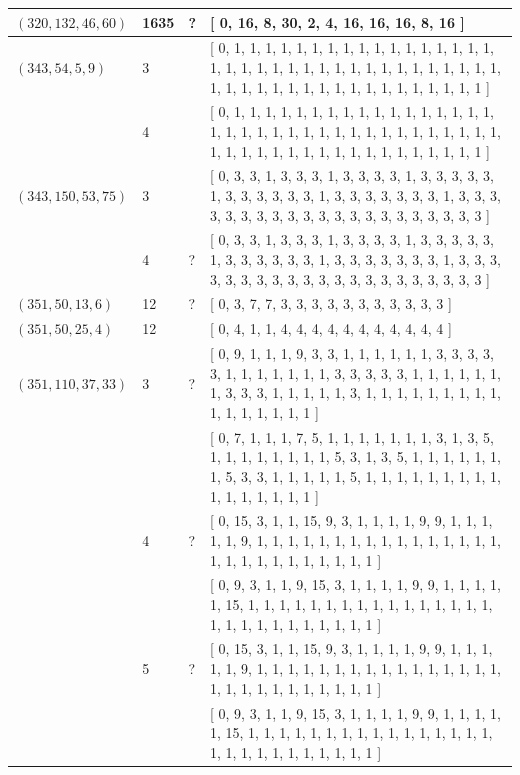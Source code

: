 \documentclass[12pt]{amsproc} %
\theoremstyle{definition}\newtheorem{defn}[thm]{Definition}
\theoremstyle{definition}\newtheorem{rem}[thm]{Remark}
\theoremstyle{definition}\newtheorem{ex}[thm]{Example}
\begin{document}
\begin{center}
\begin{longtable}{p{3.66cm}|P{0.8cm}|P{0.69cm}|p{10cm}}
		\hline
		 $(320, 132, 46, 60)$  & 1635 & ? & [ 0, 16, 8, 30, 2, 4, 16, 16, 16, 8, 16 ] \\
		\hline
		 $(343, 54, 5, 9)$  & 3 & \cite{Kantor_1986} & [ 0, 1, 1, 1, 1, 1, 1, 1, 1, 1, 1, 1, 1, 1, 1, 1, 1, 1, 1, 1, 1, 1, 1, 1, 1, 1, 1, 1, 1, 1, 1, 1, 1, 1, 1, 1, 1, 1, 1, 1, 1, 1, 1, 1, 1, 1, 1, 1, 1, 1, 1, 1, 1, 1, 1 ] \\
		   & 4 & \cite{Swartz_2015} & [ 0, 1, 1, 1, 1, 1, 1, 1, 1, 1, 1, 1, 1, 1, 1, 1, 1, 1, 1, 1, 1, 1, 1, 1, 1, 1, 1, 1, 1, 1, 1, 1, 1, 1, 1, 1, 1, 1, 1, 1, 1, 1, 1, 1, 1, 1, 1, 1, 1, 1, 1, 1, 1, 1, 1 ] \\
		\hline
		 $(343, 150, 53, 75)$  & 3 & \cite{pol-dav-smi-swa} & [ 0, 3, 3, 1, 3, 3, 3, 1, 3, 3, 3, 3, 1, 3, 3, 3, 3, 3, 1, 3, 3, 3, 3, 3, 3, 1, 3, 3, 3, 3, 3, 3, 3, 1, 3, 3, 3, 3, 3, 3, 3, 3, 3, 3, 3, 3, 3, 3, 3, 3, 3, 3, 3, 3, 3 ] \\
		   & 4 & ? & [ 0, 3, 3, 1, 3, 3, 3, 1, 3, 3, 3, 3, 1, 3, 3, 3, 3, 3, 1, 3, 3, 3, 3, 3, 3, 1, 3, 3, 3, 3, 3, 3, 3, 1, 3, 3, 3, 3, 3, 3, 3, 3, 3, 3, 3, 3, 3, 3, 3, 3, 3, 3, 3, 3, 3 ] \\
		\hline
		 $(351, 50, 13, 6)$  & 12 & ? & [ 0, 3, 7, 7, 3, 3, 3, 3, 3, 3, 3, 3, 3, 3, 3 ] \\
		\hline
		 $(351, 50, 25, 4)$  & 12 & \cite{pol-dav-smi-swa} & [ 0, 4, 1, 1, 4, 4, 4, 4, 4, 4, 4, 4, 4, 4, 4 ] \\
		\hline
		 $(351, 110, 37, 33)$  & 3 & ? & [ 0, 9, 1, 1, 1, 9, 3, 3, 1, 1, 1, 1, 1, 1, 3, 3, 3, 3, 3, 1, 1, 1, 1, 1, 1, 1, 3, 3, 3, 3, 3, 1, 1, 1, 1, 1, 1, 1, 3, 3, 3, 1, 1, 1, 1, 1, 3, 1, 1, 1, 1, 1, 1, 1, 1, 1, 1, 1, 1, 1, 1, 1, 1 ] \\
		   &  &  & [ 0, 7, 1, 1, 1, 7, 5, 1, 1, 1, 1, 1, 1, 1, 3, 1, 3, 5, 1, 1, 1, 1, 1, 1, 1, 1, 5, 3, 1, 3, 5, 1, 1, 1, 1, 1, 1, 1, 5, 3, 3, 1, 1, 1, 1, 1, 5, 1, 1, 1, 1, 1, 1, 1, 1, 1, 1, 1, 1, 1, 1, 1, 1 ] \\
		   & 4 & ? & [ 0, 15, 3, 1, 1, 15, 9, 3, 1, 1, 1, 1, 9, 9, 1, 1, 1, 1, 1, 9, 1, 1, 1, 1, 1, 1, 1, 1, 1, 1, 1, 1, 1, 1, 1, 1, 1, 1, 1, 1, 1, 1, 1, 1, 1, 1, 1 ] \\
		   &  &  & [ 0, 9, 3, 1, 1, 9, 15, 3, 1, 1, 1, 1, 9, 9, 1, 1, 1, 1, 1, 15, 1, 1, 1, 1, 1, 1, 1, 1, 1, 1, 1, 1, 1, 1, 1, 1, 1, 1, 1, 1, 1, 1, 1, 1, 1, 1, 1 ] \\
		   & 5 & ? & [ 0, 15, 3, 1, 1, 15, 9, 3, 1, 1, 1, 1, 9, 9, 1, 1, 1, 1, 1, 9, 1, 1, 1, 1, 1, 1, 1, 1, 1, 1, 1, 1, 1, 1, 1, 1, 1, 1, 1, 1, 1, 1, 1, 1, 1, 1, 1 ] \\
		   &  &  & [ 0, 9, 3, 1, 1, 9, 15, 3, 1, 1, 1, 1, 9, 9, 1, 1, 1, 1, 1, 15, 1, 1, 1, 1, 1, 1, 1, 1, 1, 1, 1, 1, 1, 1, 1, 1, 1, 1, 1, 1, 1, 1, 1, 1, 1, 1, 1 ] \\

\end{longtable}
\end{center}
\end{document}

